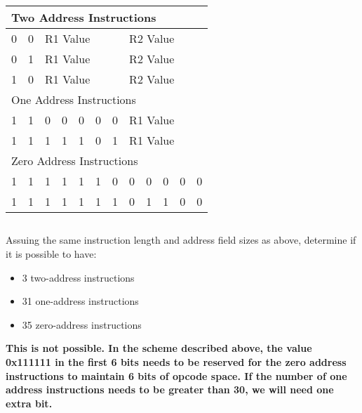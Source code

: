 \documentclass{article}
\begin{document}
    \begin{tabular}{|l|l||l|l|l|l|l||l|l|l|l|l|}
    \hline
    \multicolumn{12}{|l|}{Two Address Instructions}\\
    \hline
    0 & 0 & \multicolumn{5}{|l|}{R1 Value} & \multicolumn{5}{|l|}{R2 Value} \\
    0 & 1 & \multicolumn{5}{|l|}{R1 Value} & \multicolumn{5}{|l|}{R2 Value} \\
    1 & 0 & \multicolumn{5}{|l|}{R1 Value} & \multicolumn{5}{|l|}{R2 Value}\\
    \hline
    \multicolumn{12}{|l|}{One Address Instructions}\\
    \hline
    1 & 1 & 0 & 0 & 0 & 0 & 0 & \multicolumn{5}{l|}{R1 Value}\\
    1 & 1 & 1 & 1 & 1 & 0 & 1 & \multicolumn{5}{l|}{R1 Value}\\
    \hline
    \multicolumn{12}{|l|}{Zero Address Instructions}\\ 
    \hline
    1 & 1 & 1 & 1 & 1 & 1 & 0 & 0 & 0 & 0 & 0 & 0\\
    1 & 1 & 1 & 1 & 1 & 1 & 1 & 0 & 1 & 1 & 0 & 0\\
    \hline
    \end{tabular}

\subsection{}
Assuing the same instruction length and address field sizes as above, determine if it is possible to have:
\begin{itemize}
    \item 3 two-address instructions
    \item 31 one-address instructions
    \item 35 zero-address instructions
\end{itemize}
\vspace{5mm}
\textbf{This is not possible. In the scheme described above, the value 0x111111 in the first 6 bits needs to be reserved for the zero address instructions to maintain 6 bits of opcode space. If the number of one address instructions needs to be greater than 30, we will need one extra bit.}\\
\end{document}
